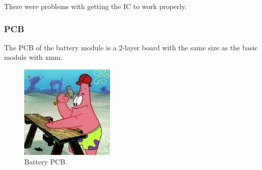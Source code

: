         There were problems with getting the IC to work properly. 
    
    \subsubsection{PCB}
        The PCB of the battery module is a 2-layer board with the same size as the basic module
        with xmm.

        \begin{figure}[H]
            \centering
            \includegraphics[width=0.4\textwidth]{assets/HW/TBD2.png}
            \caption{Battery PCB.}
        \end{figure}